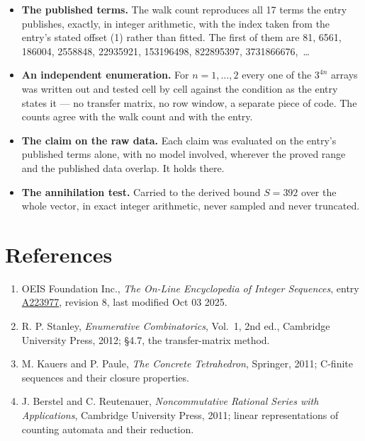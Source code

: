 \documentclass[11pt]{article}
\theoremstyle{definition}
\begin{document}
\begin{itemize}

\item {\bfseries The published terms.} The walk count reproduces all 17 terms the entry publishes, exactly, in integer arithmetic, with the index taken from the entry's stated offset (1) rather than fitted. The first of them are 81, 6561, 186004, 2558848, 22935921, 153196498, 822895397, 3731866676,~\dots

\item {\bfseries An independent enumeration.} For $n = 1,\dots,2$ every one of the $3^{4n}$ arrays was written out and tested cell by cell against the condition as the entry states it --- no transfer matrix, no row window, a separate piece of code. The counts agree with the walk count and with the entry.

\item {\bfseries The claim on the raw data.} Each claim was evaluated on the entry's published terms alone, with no model involved, wherever the proved range and the published data overlap. It holds there.

\item {\bfseries The annihilation test.} Carried to the derived bound $S = 392$ over the whole vector, in exact integer arithmetic, never sampled and never truncated.

\end{itemize}

\section{References}

\begin{enumerate}

\item OEIS Foundation Inc., \emph{The On-Line Encyclopedia of Integer Sequences}, entry \href{https://oeis.org/A223977}{A223977}, revision 8, last modified Oct 03 2025.

\item R. P. Stanley, \emph{Enumerative Combinatorics}, Vol.~1, 2nd ed., Cambridge University Press, 2012; \S4.7, the transfer-matrix method.

\item M. Kauers and P. Paule, \emph{The Concrete Tetrahedron}, Springer, 2011; C-finite sequences and their closure properties.

\item J. Berstel and C. Reutenauer, \emph{Noncommutative Rational Series with Applications}, Cambridge University Press, 2011; linear representations of counting automata and their reduction.

\end{enumerate}
\end{document}
